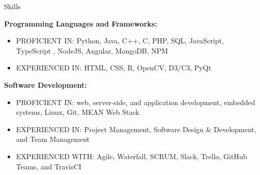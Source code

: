 \documentclass{resume} %
\begin{document}





\begin{rSection}{Skills}

{\bf Programming Languages and Frameworks:}
\begin{itemize}
    \item PROFICIENT IN: Python, Java, C++, C, PHP, SQL, JavaScript, TypeScript , NodeJS, Angular, MongoDB, NPM
    \item EXPERIENCED IN: HTML, CSS, R, OpenCV, D3/C3, PyQt
\end{itemize}
{\bf Software Development:}
\begin{itemize}
    \item PROFICIENT IN: web, server-side, and application development, embedded systems, Linux, Git, MEAN Web Stack
    \item EXPERIENCED IN: Project Management, Software Design & Development, and Team Management 
    \item EXPERIENCED WITH: Agile, Waterfall, SCRUM, Slack, Trello, GitHub Teams, and TravisCI
\end{itemize}
\end{rSection}

\end{document}
